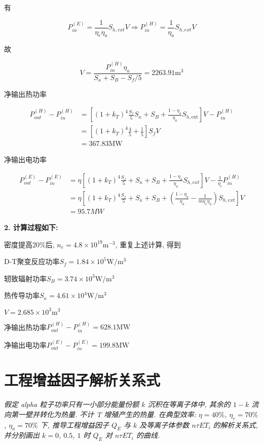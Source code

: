 \documentclass{article}
\begin{document}
有

$$P_{in}^{(E)} = \frac{1}{\eta_e \eta_a} S_{h,ext} V \Rightarrow P_{in}^{(H)} = \frac{1}{\eta_a} S_{h,ext} V$$

故

$$V = \frac{P_{in}^{(H)} \eta_a}{S_\kappa + S_B - S_f/5} = 2263.91 \text{m}^3$$

净输出热功率

\begin{equation*}
    \begin{aligned}
        P_{out}^{(H)} - P_{in}^{(H)}
        &= \left[ (1 + k_T)^4 \frac{S_f}{5} S_\kappa + S_B + \frac{1 - \eta_a}{\eta_a} S_{h,\text{ext}} \right] V - P_{in}^{(H)} \\
        &= \left[ (1 + k_T)^4 \frac{4}{5} + \frac{1}{5} \right] S_f V \\
        &= 367.83 \text{MW}
    \end{aligned}
\end{equation*}

净输出电功率

\begin{equation*}
    \begin{aligned}
        P_{o u t}^{(E)} - P_{i n}^{(E)}
        &= \eta\left[(1+k_T)^4 \frac{S_f}{5} + S_\kappa + S_B + \frac{1-\eta_a}{\eta_a} S_{h, e x t}\right] V - \frac{1}{\eta_e} P_{i n}^{(H)} \\
        & = \eta\left[(1+k_T)^4 \frac{S_f}{5} + S_\kappa + S_B + \left(\frac{1-\eta_a}{\eta_a} - \frac{1}{m \eta_e \eta_a}\right) S_{h, e x t}\right] V \\
        &= 95.7 M W
    \end{aligned}
\end{equation*}

\textbf{2. 计算过程如下:}

密度提高$20\%$后, $n_e = 4.8 \times 10^{19} \text{m}^{-3}$, 重复上述计算, 得到

D-T聚变反应功率$S_f = 1.84 \times 10^5 \text{W}/\text{m}^3$

轫致辐射功率$S_B = 3.74 \times 10^3 \text{W}/\text{m}^3$

热传导功率$S_\kappa = 4.61 \times 10^4 \text{W}/\text{m}^3$

$V = 2.685 \times 10^3 \text{m}^3$

净输出热功率$P_{out}^{(H)} - P_{in}^{(H)} = 628.1 \text{MW}$

净输出电功率$P_{out}^{(E)} - P_{in}^{(E)} = 199.8 \text{MW}$

\section{工程增益因子解析关系式}
\emph{假定 alpha 粒子功率只有一小部分能量份额 $k$ 沉积在等离子体中, 其余的 $1 - k$ 流向第一壁并转化为热量. 不计 T 增殖产生的热量. 在典型效率: $\eta = 40\%$, $\eta_e = 70\%$, $\eta_a = 70\%$ 下, 推导工程增益因子 $Q_E$ 与 $k$ 及等离子体参数 $n\tau E T_i$ 的解析关系式, 并分别画出 $k = 0$, $0.5$, $1$ 时 $Q_E$ 对 $n\tau E T_i$ 的曲线. }
\end{document}
